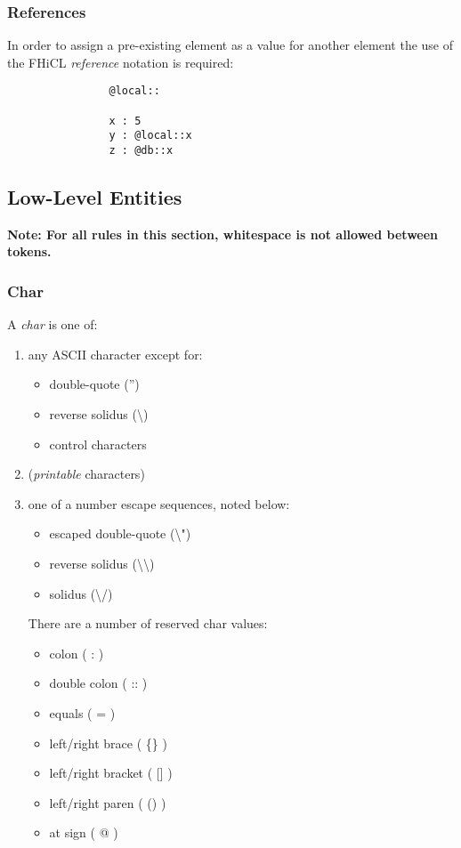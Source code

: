 \documentclass{memarticle}
\begin{document}
		\subsubsection{References}
			In order to assign a pre-existing element 
			as a value for another element
			the use of the FHiCL \emph{reference} notation is required:
			\begin{verbatim}
				@local::
				
				x : 5
				y : @local::x
				z : @db::x
			\end{verbatim}
			
	\subsection{Low-Level Entities}
		\bf Note: \rm For all rules in this section,
		whitespace is not allowed between tokens.
		\subsubsection{Char}
			A \emph{char} is one of:
			\begin{enumerate}
				\item any ASCII character except for:
				\begin{itemize}
					\item double-quote ('') 
					\item reverse solidus (\textbackslash)
					\item control characters
				\end{itemize}
				\item (\emph{printable} characters)
				\item one of a number escape sequences, noted below:
				\begin{itemize}
					\item escaped double-quote (\textbackslash")
					\item reverse solidus (\textbackslash\textbackslash)
					\item solidus (\textbackslash/)
				\end{itemize}
				There are a number of reserved char values:
				\begin{itemize}
					\item colon ( : )
					\item double colon ( :: )
					\item equals ( = )
					\item left/right brace ( \{\} )
					\item left/right bracket ( [] )
					\item left/right paren ( () )
					\item at sign ( @ )
				\end{itemize}		
			\end{enumerate}
			
\end{document}
